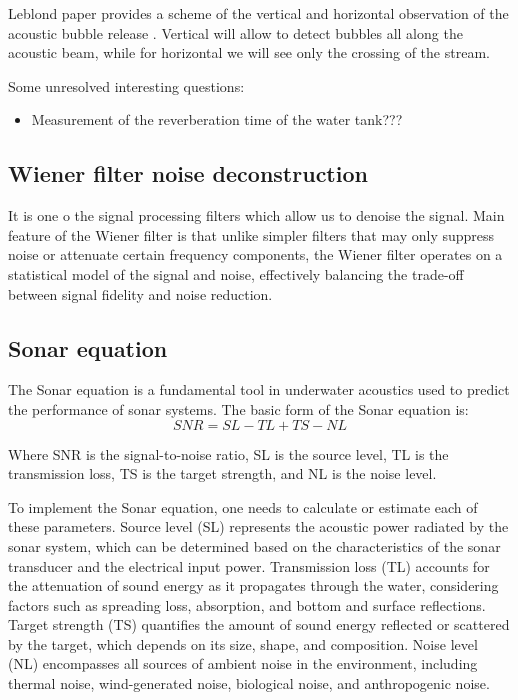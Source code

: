 \documentclass[11pt]{article}
\begin{document}
Leblond paper provides a scheme of the vertical and horizontal observation of the acoustic bubble release \cite*{leblond_acoustic_2014}. Vertical will allow to detect bubbles all along the acoustic beam, while for horizontal we will see only the crossing of the stream.

Some unresolved interesting questions:
\begin{itemize}
    \item Measurement of the reverberation time of the water tank???
\end{itemize}

\subsection*{Wiener filter noise deconstruction}

It is one o the signal processing filters which allow us to denoise the signal. Main feature of the Wiener filter is that unlike simpler filters that may only suppress noise or attenuate certain frequency components, the Wiener filter operates on a statistical model of the signal and noise, effectively balancing the trade-off between signal fidelity and noise reduction.



\subsection*{Sonar equation }
The Sonar equation is a fundamental tool in underwater acoustics used to predict the performance of sonar systems. 
The basic form of the Sonar equation is:
\begin{equation}
    SNR=SL-TL+TS-NL
\end{equation}

Where
SNR is the signal-to-noise ratio,
SL is the source level,
TL is the transmission loss,
TS is the target strength, and
NL is the noise level.

To implement the Sonar equation, one needs to calculate or estimate each of these parameters. 
Source level (SL) represents the acoustic power radiated by the sonar system, which can be determined based on the characteristics of the sonar transducer and the electrical input power. 
Transmission loss (TL) accounts for the attenuation of sound energy as it propagates through the water, considering factors such as spreading loss, absorption, and bottom and surface reflections. 
Target strength (TS) quantifies the amount of sound energy reflected or scattered by the target, which depends on its size, shape, and composition. 
Noise level (NL) encompasses all sources of ambient noise in the environment, including thermal noise, wind-generated noise, biological noise, and anthropogenic noise.
\end{document}
